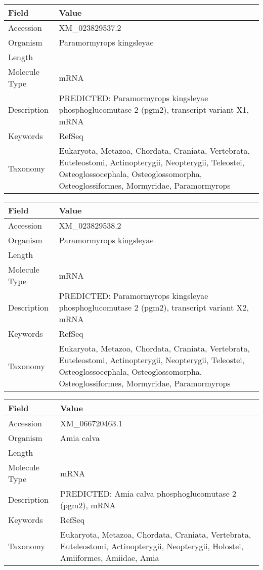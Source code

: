 \documentclass[10pt]{article}
\begin{document}
\vspace{1em}
{\footnotesize
\begin{longtable}{>{\raggedright\arraybackslash}p{4.5cm} >{\raggedright\arraybackslash}p{11.5cm}}
\textbf{Field} & \textbf{Value} \\
\hline
Accession & XM\_023829537.2 \\
Organism & Paramormyrops kingsleyae \\
Length & 3149 \\
Molecule Type & mRNA \\
Description & PREDICTED: Paramormyrops kingsleyae phosphoglucomutase 2 (pgm2), transcript variant X1, mRNA \\
Keywords & RefSeq \\
Taxonomy & Eukaryota, Metazoa, Chordata, Craniata, Vertebrata, Euteleostomi, Actinopterygii, Neopterygii, Teleostei, Osteoglossocephala, Osteoglossomorpha, Osteoglossiformes, Mormyridae, Paramormyrops \\
\end{longtable}
}

\vspace{1em}
{\footnotesize
\begin{longtable}{>{\raggedright\arraybackslash}p{4.5cm} >{\raggedright\arraybackslash}p{11.5cm}}
\textbf{Field} & \textbf{Value} \\
\hline
Accession & XM\_023829538.2 \\
Organism & Paramormyrops kingsleyae \\
Length & 3107 \\
Molecule Type & mRNA \\
Description & PREDICTED: Paramormyrops kingsleyae phosphoglucomutase 2 (pgm2), transcript variant X2, mRNA \\
Keywords & RefSeq \\
Taxonomy & Eukaryota, Metazoa, Chordata, Craniata, Vertebrata, Euteleostomi, Actinopterygii, Neopterygii, Teleostei, Osteoglossocephala, Osteoglossomorpha, Osteoglossiformes, Mormyridae, Paramormyrops \\
\end{longtable}
}

\vspace{1em}
{\footnotesize
\begin{longtable}{>{\raggedright\arraybackslash}p{4.5cm} >{\raggedright\arraybackslash}p{11.5cm}}
\textbf{Field} & \textbf{Value} \\
\hline
Accession & XM\_066720463.1 \\
Organism & Amia calva \\
Length & 4710 \\
Molecule Type & mRNA \\
Description & PREDICTED: Amia calva phosphoglucomutase 2 (pgm2), mRNA \\
Keywords & RefSeq \\
Taxonomy & Eukaryota, Metazoa, Chordata, Craniata, Vertebrata, Euteleostomi, Actinopterygii, Neopterygii, Holostei, Amiiformes, Amiidae, Amia \\
\end{longtable}
}
\end{document}
